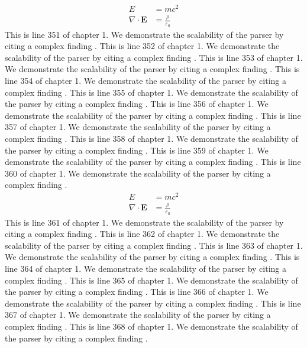 \begin{align*}
  E &= mc^2 \\
  \nabla \cdot \mathbf{E} &= \frac{\rho}{\varepsilon_0}
\end{align*}
This is line 351 of chapter 1. We demonstrate the scalability of the parser by citing a complex finding \cite{ref1_351}.
This is line 352 of chapter 1. We demonstrate the scalability of the parser by citing a complex finding \cite{ref1_352}.
This is line 353 of chapter 1. We demonstrate the scalability of the parser by citing a complex finding \cite{ref1_353}.
This is line 354 of chapter 1. We demonstrate the scalability of the parser by citing a complex finding \cite{ref1_354}.
This is line 355 of chapter 1. We demonstrate the scalability of the parser by citing a complex finding \cite{ref1_355}.
This is line 356 of chapter 1. We demonstrate the scalability of the parser by citing a complex finding \cite{ref1_356}.
This is line 357 of chapter 1. We demonstrate the scalability of the parser by citing a complex finding \cite{ref1_357}.
This is line 358 of chapter 1. We demonstrate the scalability of the parser by citing a complex finding \cite{ref1_358}.
This is line 359 of chapter 1. We demonstrate the scalability of the parser by citing a complex finding \cite{ref1_359}.
This is line 360 of chapter 1. We demonstrate the scalability of the parser by citing a complex finding \cite{ref1_360}.
\begin{align*}
  E &= mc^2 \\
  \nabla \cdot \mathbf{E} &= \frac{\rho}{\varepsilon_0}
\end{align*}
This is line 361 of chapter 1. We demonstrate the scalability of the parser by citing a complex finding \cite{ref1_361}.
This is line 362 of chapter 1. We demonstrate the scalability of the parser by citing a complex finding \cite{ref1_362}.
This is line 363 of chapter 1. We demonstrate the scalability of the parser by citing a complex finding \cite{ref1_363}.
This is line 364 of chapter 1. We demonstrate the scalability of the parser by citing a complex finding \cite{ref1_364}.
This is line 365 of chapter 1. We demonstrate the scalability of the parser by citing a complex finding \cite{ref1_365}.
This is line 366 of chapter 1. We demonstrate the scalability of the parser by citing a complex finding \cite{ref1_366}.
This is line 367 of chapter 1. We demonstrate the scalability of the parser by citing a complex finding \cite{ref1_367}.
This is line 368 of chapter 1. We demonstrate the scalability of the parser by citing a complex finding \cite{ref1_368}.
